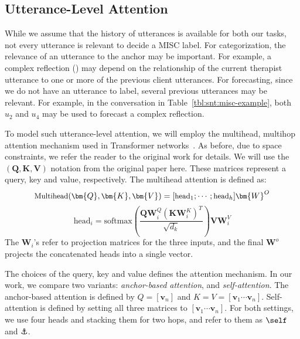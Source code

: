 \subsection{Utterance-Level Attention}
\label{ssec:sentence_att}
While we assume that the history of utterances is available for both
our tasks, not every utterance is relevant to decide a MISC label.
%
For categorization, the relevance of an utterance to the anchor may
be important. For example, a complex reflection (\REC) may depend on
the relationship of the current therapist utterance to one or more
of the previous client utterances. For forecasting, since we do not
have an utterance to label, several previous utterances may
be relevant. For example, in the conversation in
Table~\ref{tbl:snt:misc-example}, both $u_2$ and $u_4$ may be used to
forecast a complex reflection.

To model such utterance-level attention, we will employ the
multihead, multihop attention mechanism used in Transformer
networks~\citep{NIPS2017_7181}. As before, due to space constraints,
we refer the reader to the original work for details. We will use
the $(\bm{Q}, \bm{K}, \bm{V})$ notation from the original paper
here. These matrices represent a query, key and value,
respectively. The multihead attention is defined as:
%
\begin{equation}
\label{eq:multihead_attention}
{\small \text{Multihead}(\bm{Q},\bm{K},\bm{V}) = [\text{head}_{1};\cdots; \text{head}_{h}]\bm{W}^{O}}
\end{equation}
\begin{equation}
 \text{head}_{i} = \text{softmax}\left(\frac{\bm{Q}\bm{W}^{Q}_{i}\left(\bm{K}\bm{W}^{K}_{i}\right)^T}{\sqrt{d_{k}}}\right)\bm{V}\bm{W}^{V}_{i}
\end{equation}
The $\bm{W}_i$'s refer to projection matrices for the three inputs,
and the final $\bm{W}^o$ projects the concatenated heads into a
single vector.

The choices of the query, key and value defines the attention
mechanism. In our work, we compare two variants: {\em anchor-based
  attention}, and {\em self-attention}. The anchor-based attention
is defined by $Q = [\bm{v}_{n}]$ and
$K=V=[\bm{v}_{1} \cdots \bm{v}_{n}]$.  Self-attention is defined by
setting all three matrices to $[\bm{v}_{1} \cdots \bm{v}_{n}]$.
%
For both settings, we use four heads and stacking them for two hops,
and refer to them as $\self$ and $\anchor$.


